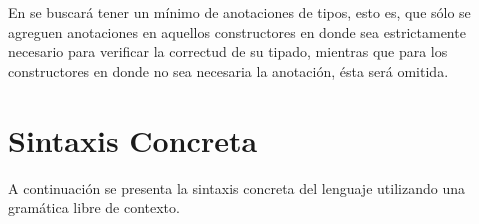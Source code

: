 \documentclass[12pt]{extarticle}
\begin{document}
En \minhs se buscará tener un mínimo de anotaciones de tipos, esto es, que sólo se agreguen anotaciones en aquellos constructores en donde sea estrictamente necesario para verificar la correctud de su tipado, mientras que para los constructores en donde no sea necesaria la anotación, ésta será omitida.





\section{Sintaxis Concreta}

A continuación se presenta la sintaxis concreta del lenguaje utilizando una gramática libre de contexto. 
\end{document}
